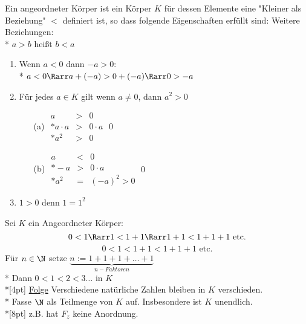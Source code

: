     Ein angeordneter Körper ist ein Körper $K$ für dessen Elemente eine "Kleiner als Beziehung" $<$ definiert ist, so dass folgende Eigenschaften erfüllt sind:
	Weitere Beziehungen:\\*
	$a > b$ heißt $b < a$
	\begin{enumerate}
	\item{Wenn $a < 0$ dann $-a > 0$:\\*
	$a < 0 \Rarr a + (-a) > 0 + (-a) \Rarr 0 > -a$}
	\item{Für jedes $a \in K $ gilt wenn $a \neq 0$, dann $a^2 > 0$
	\begin{itemize}
	\item[(a)]{$\begin{array}{ccc}
	a &>& 0\\*
	a · a &>& 0 · a\\*
	a^2 &>& 0
	\end{array}$\qed}
	\item[(b)]{$\begin{array}{ccc}
		a &<& 0\\*
		-a &>& 0 · a\\*
		a^2 &=& (-a)^2 > 0
		\end{array}$\qed}
	\end{itemize}}
	\item{$1 > 0 $ denn $1 = 1^2$}
	\end{enumerate}
	Sei $K$ ein Angeordneter Körper:
	$$0 < 1 \Rarr 1 < 1 + 1 \Rarr 1 + 1 < 1 + 1 + 1 \text{ etc.}$$
	$$0 < 1 < 1 + 1 < 1 + 1 +1 \text{ etc.}$$
	Für $n \in \N$ setze $\underbrace{n:= 1 + 1 + 1 + … + 1}_{n-Faktoren}$\\*
	Dann $0 < 1 < 2 < 3 … $ in $K$\\*[4pt]
	\ul{Folge} Verschiedene natürliche Zahlen bleiben in $K$ verschieden.\\*
	Fasse $\N$ als Teilmenge von $K$ auf.
	Insbesondere ist $K$ unendlich.\\*[8pt]
	z.B. hat $F_z$ keine Anordnung.


